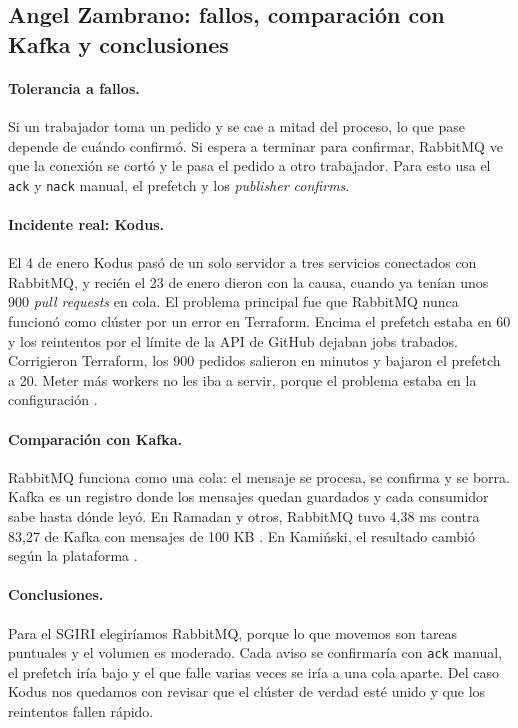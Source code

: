 \subsection*{Angel Zambrano: fallos, comparación con Kafka y conclusiones}

\paragraph{Tolerancia a fallos.}
Si un trabajador toma un pedido y se cae a mitad del proceso, lo que pase depende de cuándo confirmó. Si espera a terminar para confirmar, RabbitMQ ve que la conexión se cortó y le pasa el pedido a otro trabajador. Para esto usa el \texttt{ack} y \texttt{nack} manual, el prefetch y los \textit{publisher confirms}.

\paragraph{Incidente real: Kodus.}
El 4 de enero Kodus pasó de un solo servidor a tres servicios conectados con RabbitMQ, y recién el 23 de enero dieron con la causa, cuando ya tenían unos 900 \textit{pull requests} en cola. El problema principal fue que RabbitMQ nunca funcionó como clúster por un error en Terraform. Encima el prefetch estaba en 60 y los reintentos por el límite de la API de GitHub dejaban jobs trabados. Corrigieron Terraform, los 900 pedidos salieron en minutos y bajaron el prefetch a 20. Meter más workers no les iba a servir, porque el problema estaba en la configuración \cite{malinosqui2026kodus}.

\paragraph{Comparación con Kafka.}
RabbitMQ funciona como una cola: el mensaje se procesa, se confirma y se borra. Kafka es un registro donde los mensajes quedan guardados y cada consumidor sabe hasta dónde leyó. En Ramadan y otros, RabbitMQ tuvo 4,38 ms contra 83,27 de Kafka con mensajes de 100 KB \cite{rias2026kafka}. En Kamiński, el resultado cambió según la plataforma \cite{kaminski2025rabbitmq}.

\paragraph{Conclusiones.}
Para el SGIRI elegiríamos RabbitMQ, porque lo que movemos son tareas puntuales y el volumen es moderado. Cada aviso se confirmaría con \texttt{ack} manual, el prefetch iría bajo y el que falle varias veces se iría a una cola aparte. Del caso Kodus nos quedamos con revisar que el clúster de verdad esté unido y que los reintentos fallen rápido.
